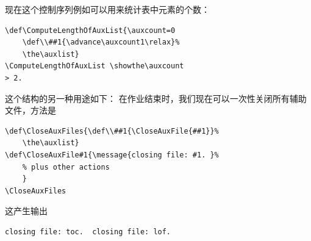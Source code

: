 \documentclass[a4paper]{rapport3}
\begin{document}
现在这个控制序列例如可以用来统计表中元素的个数：\begin{verbatim}
\def\ComputeLengthOfAuxList{\auxcount=0 
    \def\\##1{\advance\auxcount1\relax}%
    \the\auxlist}
\ComputeLengthOfAuxList \showthe\auxcount
> 2.
\end{verbatim}
这个结构的另一种用途如下：
在作业结束时，我们现在可以一次性关闭所有辅助文件，方法是\begin{verbatim}
\def\CloseAuxFiles{\def\\##1{\CloseAuxFile{##1}}%
    \the\auxlist}
\def\CloseAuxFile#1{\message{closing file: #1. }%
    % plus other actions
    }
\CloseAuxFiles
\end{verbatim}
这产生输出
\begin{verbatim}
closing file: toc.  closing file: lof. 
\end{verbatim}


\end{document}
